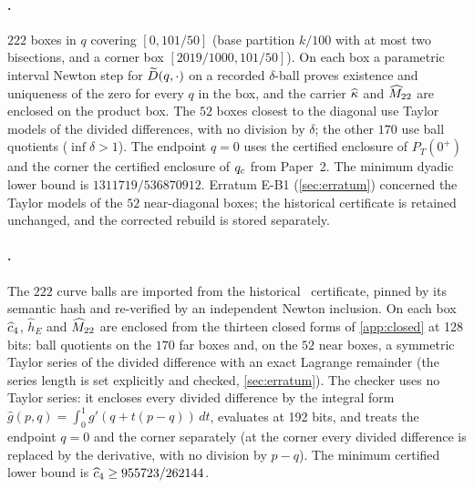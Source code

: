 \paragraph{\lemK.} $222$ boxes in $q$ covering $[0,101/50]$ (base partition $k/100$ with at most two bisections,
and a corner box $[2019/1000,101/50]$). On each box a parametric
interval Newton step for $\widetilde{D}(q,\cdot)$ on a recorded $\delta$-ball proves existence and uniqueness of the zero for every
$q$ in the box, and the carrier $\widehat{\kappa}$ and $\widehat{M}_{22}$ are enclosed on the product box. The $52$ boxes closest to the
diagonal use Taylor models of the divided differences, with no division by $\delta$; the other $170$ use ball
quotients ($\inf\delta>1$). The endpoint $q=0$ uses the
certified enclosure of $P_T(0^+)$ and the corner the certified enclosure of $q_{c}$ from Paper~2. The minimum dyadic
lower bound is $1311719/536870912$. Erratum E-B1 (\cref{sec:erratum}) concerned the Taylor models of the $52$
near-diagonal boxes; the historical certificate is retained unchanged, and the corrected rebuild is stored separately.

\paragraph{\lemQ.} The $222$ curve balls are imported from the historical \lemK\ certificate, pinned by its semantic
hash and re-verified by an independent Newton inclusion. On each box $\widehat{c}_4$, $\widehat h_E$ and $\widehat{M}_{22}$ are
enclosed from the thirteen closed forms of \cref{app:closed} at 128 bits: ball quotients on the $170$ far boxes and,
on the $52$ near boxes, a symmetric Taylor series of the divided difference with an exact Lagrange remainder (the series
length is set explicitly and checked, \cref{sec:erratum}). The checker uses no Taylor series: it encloses
every divided difference by the integral form $\hat g(p,q)=\int_0^1 g'(q+t(p-q))\,dt$, evaluates at 192 bits, and
treats the endpoint $q=0$ and the corner separately (at the corner every divided difference is replaced by the
derivative, with no division by $p-q$). The minimum certified lower bound is $\widehat{c}_4\ge955723/262144$.


